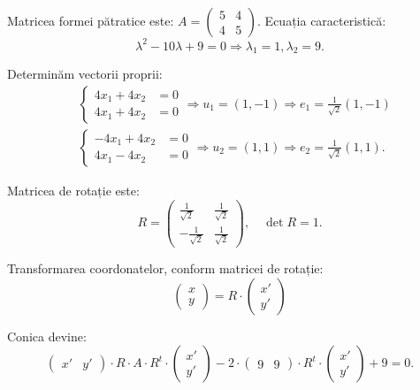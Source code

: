 \documentclass[11pt,a4paper]{article}
\theoremstyle{dotless}
\theoremstyle{dotlessdr}
\begin{document}
Matricea formei pătratice este: $A = \begin{pmatrix} 5 & 4 \\ 4 & 5 \end{pmatrix}$.
Ecuația caracteristică:
\[
  \lambda^2 - 10\lambda + 9 = 0 \Rightarrow \lambda_1 = 1, \lambda_2 = 9.
\]

Determinăm vectorii proprii:
\begin{align*}
  & \begin{cases}
    4x_1 + 4x_2 &= 0 \\
    4x_1 + 4x_2 &= 0
  \end{cases} \Rightarrow u_1 = (1, -1) \Rightarrow e_1 = \frac{1}{\sqrt{2}} (1, -1) \\
  & \begin{cases}
    -4x_1 + 4x_2 &= 0 \\
    4x_1 - 4x_2 &= 0
  \end{cases} \Rightarrow u_2 = (1, 1) \Rightarrow e_2 = \frac{1}{\sqrt{2}} (1, 1).
\end{align*}

Matricea de rotație este:
\[
  R = \begin{pmatrix}
    \frac{1}{\sqrt{2}} & \frac{1}{\sqrt{2}} \\
    -\frac{1}{\sqrt{2}} & \frac{1}{\sqrt{2}}
  \end{pmatrix}, \quad \det R = 1.
\]

Transformarea coordonatelor, conform matricei de rotație:
\[
  \begin{pmatrix}
    x \\ y
  \end{pmatrix} = R \cdot \begin{pmatrix} x' \\ y' \end{pmatrix}
\]

Conica devine:
\[
  \begin{pmatrix}
    x' & y'
  \end{pmatrix} \cdot R \cdot A \cdot R^t \cdot
  \begin{pmatrix}
    x' \\ y'
  \end{pmatrix} - 2 \cdot
  \begin{pmatrix}
    9 & 9 
  \end{pmatrix} \cdot R^t \cdot
  \begin{pmatrix}
    x' \\ y'
  \end{pmatrix} + 9 = 0.
\]
\end{document}

